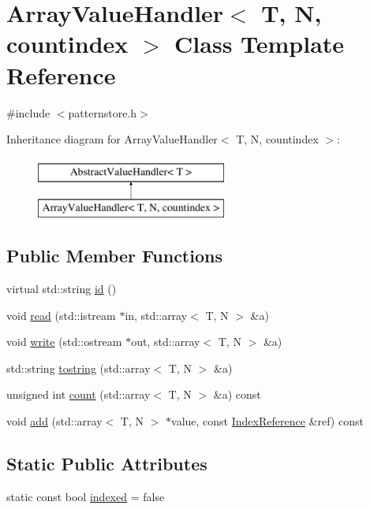 \hypertarget{classArrayValueHandler}{}\section{Array\+Value\+Handler$<$ T, N, countindex $>$ Class Template Reference}
\label{classArrayValueHandler}


{\ttfamily \#include $<$patternstore.\+h$>$}

Inheritance diagram for Array\+Value\+Handler$<$ T, N, countindex $>$\+:\begin{figure}[H]
\begin{center}
\leavevmode
\includegraphics[height=2.000000cm]{classArrayValueHandler}
\end{center}
\end{figure}
\subsection*{Public Member Functions}
\begin{DoxyCompactItemize}
\item 
virtual std\+::string \hyperlink{classArrayValueHandler_ac82e2a0341b8f0e66b36a07b91fbed42}{id} ()
\item 
void \hyperlink{classArrayValueHandler_a35c445a9b0de620ca4b032e0a34d0dee}{read} (std\+::istream $\ast$in, std\+::array$<$ T, N $>$ \&a)
\item 
void \hyperlink{classArrayValueHandler_ab081c8ac7e02d523bb8198611c90284c}{write} (std\+::ostream $\ast$out, std\+::array$<$ T, N $>$ \&a)
\item 
std\+::string \hyperlink{classArrayValueHandler_a51b18a3051bc51765731601edbdc8e34}{tostring} (std\+::array$<$ T, N $>$ \&a)
\item 
unsigned int \hyperlink{classArrayValueHandler_aa0b5815b513c2886172d0a028ffb2ff3}{count} (std\+::array$<$ T, N $>$ \&a) const 
\item 
void \hyperlink{classArrayValueHandler_a11702281d720f428e59b38f25790b68e}{add} (std\+::array$<$ T, N $>$ $\ast$value, const \hyperlink{classIndexReference}{Index\+Reference} \&ref) const 
\end{DoxyCompactItemize}
\subsection*{Static Public Attributes}
\begin{DoxyCompactItemize}
\item 
static const bool \hyperlink{classArrayValueHandler_a89c7c6a8820236bc45f71f446400b851}{indexed} = false
\end{DoxyCompactItemize}


